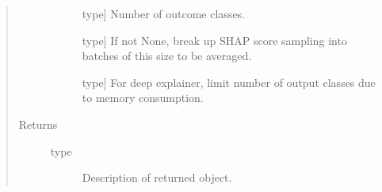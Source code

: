 \documentclass[letterpaper,10pt,english]{sphinxmanual}
\begin{document}
\begin{fulllineitems}
\begin{fulllineitems}
\begin{quote}
\begin{description}
\begin{description}
\item[{}] \leavevmode{[}type{]}
Number of outcome classes.

\item[{}] \leavevmode{[}type{]}
If not None, break up SHAP score sampling into batches of this size to be averaged.

\item[{}] \leavevmode{[}type{]}
For deep explainer, limit number of output classes due to memory consumption.

\end{description}

\item[{Returns}] \leavevmode\begin{description}
\item[{type}] \leavevmode
Description of returned object.

\end{description}

\end{description}\end{quote}

\end{fulllineitems}


\end{fulllineitems}

\end{document}
